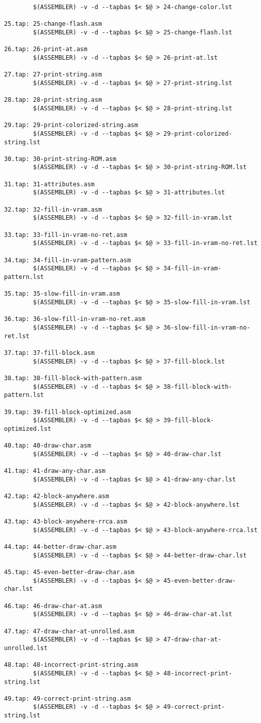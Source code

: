 \documentclass{article}
\begin{document}
\begin{verbatim}
        $(ASSEMBLER) -v -d --tapbas $< $@ > 24-change-color.lst
 
25.tap: 25-change-flash.asm
        $(ASSEMBLER) -v -d --tapbas $< $@ > 25-change-flash.lst
 
26.tap: 26-print-at.asm
        $(ASSEMBLER) -v -d --tapbas $< $@ > 26-print-at.lst
 
27.tap: 27-print-string.asm
        $(ASSEMBLER) -v -d --tapbas $< $@ > 27-print-string.lst
 
28.tap: 28-print-string.asm
        $(ASSEMBLER) -v -d --tapbas $< $@ > 28-print-string.lst
 
29.tap: 29-print-colorized-string.asm
        $(ASSEMBLER) -v -d --tapbas $< $@ > 29-print-colorized-string.lst
 
30.tap: 30-print-string-ROM.asm
        $(ASSEMBLER) -v -d --tapbas $< $@ > 30-print-string-ROM.lst
 
31.tap: 31-attributes.asm
        $(ASSEMBLER) -v -d --tapbas $< $@ > 31-attributes.lst
 
32.tap: 32-fill-in-vram.asm
        $(ASSEMBLER) -v -d --tapbas $< $@ > 32-fill-in-vram.lst
 
33.tap: 33-fill-in-vram-no-ret.asm
        $(ASSEMBLER) -v -d --tapbas $< $@ > 33-fill-in-vram-no-ret.lst
 
34.tap: 34-fill-in-vram-pattern.asm
        $(ASSEMBLER) -v -d --tapbas $< $@ > 34-fill-in-vram-pattern.lst
 
35.tap: 35-slow-fill-in-vram.asm
        $(ASSEMBLER) -v -d --tapbas $< $@ > 35-slow-fill-in-vram.lst
 
36.tap: 36-slow-fill-in-vram-no-ret.asm
        $(ASSEMBLER) -v -d --tapbas $< $@ > 36-slow-fill-in-vram-no-ret.lst
 
37.tap: 37-fill-block.asm
        $(ASSEMBLER) -v -d --tapbas $< $@ > 37-fill-block.lst
 
38.tap: 38-fill-block-with-pattern.asm
        $(ASSEMBLER) -v -d --tapbas $< $@ > 38-fill-block-with-pattern.lst
 
39.tap: 39-fill-block-optimized.asm
        $(ASSEMBLER) -v -d --tapbas $< $@ > 39-fill-block-optimized.lst
 
40.tap: 40-draw-char.asm
        $(ASSEMBLER) -v -d --tapbas $< $@ > 40-draw-char.lst
 
41.tap: 41-draw-any-char.asm
        $(ASSEMBLER) -v -d --tapbas $< $@ > 41-draw-any-char.lst
 
42.tap: 42-block-anywhere.asm
        $(ASSEMBLER) -v -d --tapbas $< $@ > 42-block-anywhere.lst
 
43.tap: 43-block-anywhere-rrca.asm
        $(ASSEMBLER) -v -d --tapbas $< $@ > 43-block-anywhere-rrca.lst
 
44.tap: 44-better-draw-char.asm
        $(ASSEMBLER) -v -d --tapbas $< $@ > 44-better-draw-char.lst
 
45.tap: 45-even-better-draw-char.asm
        $(ASSEMBLER) -v -d --tapbas $< $@ > 45-even-better-draw-char.lst
 
46.tap: 46-draw-char-at.asm
        $(ASSEMBLER) -v -d --tapbas $< $@ > 46-draw-char-at.lst
 
47.tap: 47-draw-char-at-unrolled.asm
        $(ASSEMBLER) -v -d --tapbas $< $@ > 47-draw-char-at-unrolled.lst
 
48.tap: 48-incorrect-print-string.asm
        $(ASSEMBLER) -v -d --tapbas $< $@ > 48-incorrect-print-string.lst
 
49.tap: 49-correct-print-string.asm
        $(ASSEMBLER) -v -d --tapbas $< $@ > 49-correct-print-string.lst

\end{verbatim}
\end{document}
